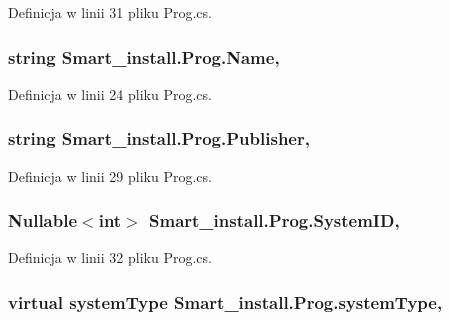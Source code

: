 Definicja w linii 31 pliku Prog.\+cs.

\hypertarget{class_smart__install_1_1_prog_a27bb79e4d190a1233ea020dd5e42640b}{
\subsubsection[{Name}]{\setlength{\rightskip}{0pt plus 5cm}string Smart\+\_\+install.\+Prog.\+Name\hspace{0.3cm}{\ttfamily [get]}, {\ttfamily [set]}}}\label{class_smart__install_1_1_prog_a27bb79e4d190a1233ea020dd5e42640b}


Definicja w linii 24 pliku Prog.\+cs.

\hypertarget{class_smart__install_1_1_prog_a7323e69631bf602cefbdb2e500553ec7}{
\subsubsection[{Publisher}]{\setlength{\rightskip}{0pt plus 5cm}string Smart\+\_\+install.\+Prog.\+Publisher\hspace{0.3cm}{\ttfamily [get]}, {\ttfamily [set]}}}\label{class_smart__install_1_1_prog_a7323e69631bf602cefbdb2e500553ec7}


Definicja w linii 29 pliku Prog.\+cs.

\hypertarget{class_smart__install_1_1_prog_abba886f20aedba13ab6739e4726eaf22}{
\subsubsection[{System\+I\+D}]{\setlength{\rightskip}{0pt plus 5cm}Nullable$<$int$>$ Smart\+\_\+install.\+Prog.\+System\+I\+D\hspace{0.3cm}{\ttfamily [get]}, {\ttfamily [set]}}}\label{class_smart__install_1_1_prog_abba886f20aedba13ab6739e4726eaf22}


Definicja w linii 32 pliku Prog.\+cs.

\hypertarget{class_smart__install_1_1_prog_ad590b1e68fbf5df57d8844c8fb438a89}{
\subsubsection[{system\+Type}]{\setlength{\rightskip}{0pt plus 5cm}virtual {\bf system\+Type} Smart\+\_\+install.\+Prog.\+system\+Type\hspace{0.3cm}{\ttfamily [get]}, {\ttfamily [set]}}}\label{class_smart__install_1_1_prog_ad590b1e68fbf5df57d8844c8fb438a89}


